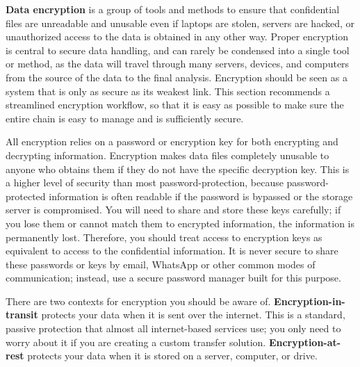 \textbf{Data encryption} is a group of tools and methods
to ensure that confidential files are unreadable and unusable
even if laptops are stolen, servers are hacked,
or unauthorized access to the data is obtained in any other way.
Proper encryption is central to secure data handling,
and can rarely be condensed into a single tool or method,
as the data will travel through many servers, devices, and computers
from the source of the data to the final analysis.
Encryption should be seen as a system
that is only as secure as its weakest link.
This section recommends a streamlined encryption workflow,
so that it is easy as possible to make sure
the entire chain is easy to manage and is sufficiently secure.

All encryption relies on a password or encryption key
for both encrypting and decrypting information.
Encryption makes data files completely unusable
to anyone who obtains them if they do not have the specific decryption key.
This is a higher level of security than most password-protection,
because password-protected information is often readable
if the password is bypassed or the storage server is compromised.
You will need to share and store these keys carefully;
if you lose them or cannot match them to encrypted information,
the information is permanently lost.
Therefore, you should treat access to encryption keys
as equivalent to access to the confidential information.
It is never secure to share these passwords or keys by email,
WhatsApp or other common modes of communication;
instead, use a secure password manager built for this purpose.

There are two contexts for encryption you should be aware of.
\textbf{Encryption-in-transit} protects your data 
when it is sent over the internet.
This is a standard, passive protection that almost all internet-based services use;
you only need to worry about it if you are creating a custom transfer solution.
\textbf{Encryption-at-rest} protects your data 
when it is stored on a server, computer, or drive.

